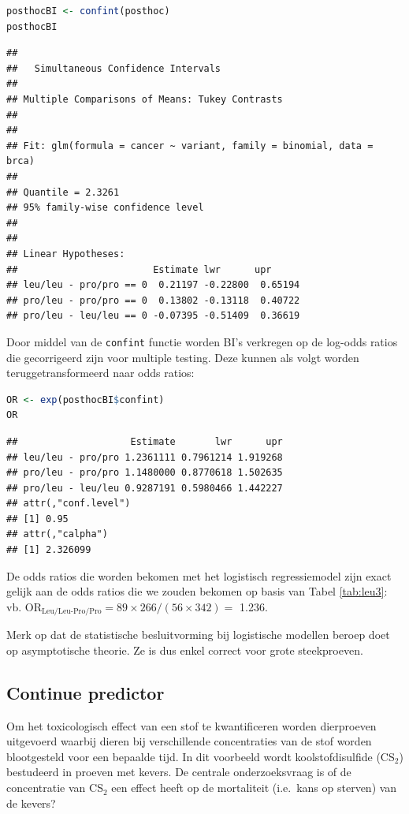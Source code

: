 \documentclass[
  12pt,dutch,coursenotes]{book}
\newcommand{\passthrough}[1]{#1}
\begin{document}
\begin{lstlisting}[language=R]
posthocBI <- confint(posthoc)
posthocBI
\end{lstlisting}

\begin{lstlisting}
## 
##   Simultaneous Confidence Intervals
## 
## Multiple Comparisons of Means: Tukey Contrasts
## 
## 
## Fit: glm(formula = cancer ~ variant, family = binomial, data = brca)
## 
## Quantile = 2.3261
## 95% family-wise confidence level
##  
## 
## Linear Hypotheses:
##                        Estimate lwr      upr     
## leu/leu - pro/pro == 0  0.21197 -0.22800  0.65194
## pro/leu - pro/pro == 0  0.13802 -0.13118  0.40722
## pro/leu - leu/leu == 0 -0.07395 -0.51409  0.36619
\end{lstlisting}

Door middel van de \passthrough{\lstinline!confint!} functie worden BI's verkregen op de log-odds ratios die gecorrigeerd zijn voor multiple testing. Deze kunnen als volgt worden teruggetransformeerd naar odds ratios:

\begin{lstlisting}[language=R]
OR <- exp(posthocBI$confint)
OR
\end{lstlisting}

\begin{lstlisting}
##                    Estimate       lwr      upr
## leu/leu - pro/pro 1.2361111 0.7961214 1.919268
## pro/leu - pro/pro 1.1480000 0.8770618 1.502635
## pro/leu - leu/leu 0.9287191 0.5980466 1.442227
## attr(,"conf.level")
## [1] 0.95
## attr(,"calpha")
## [1] 2.326099
\end{lstlisting}

De odds ratios die worden bekomen met het logistisch regressiemodel zijn exact gelijk aan de odds ratios die we zouden bekomen op basis van Tabel \ref{tab:leu3}:
vb. \(\text{OR}_\text{Leu/Leu-Pro/Pro}=89\times 266/(56\times 342)=\) 1.236.

Merk op dat de statistische besluitvorming bij logistische modellen beroep doet op asymptotische theorie. Ze is dus enkel correct voor grote steekproeven.

\hypertarget{continue-predictor}{%
\subsection{Continue predictor}\label{continue-predictor}}

Om het toxicologisch effect van een stof te kwantificeren worden dierproeven uitgevoerd waarbij dieren bij verschillende concentraties van de stof worden blootgesteld voor een bepaalde tijd. In dit voorbeeld wordt koolstofdisulfide (CS\(_2\)) bestudeerd in proeven met kevers.
De centrale onderzoeksvraag is of de concentratie van CS\(_2\) een effect heeft op de mortaliteit (i.e.~kans op sterven) van de kevers?
\end{document}
